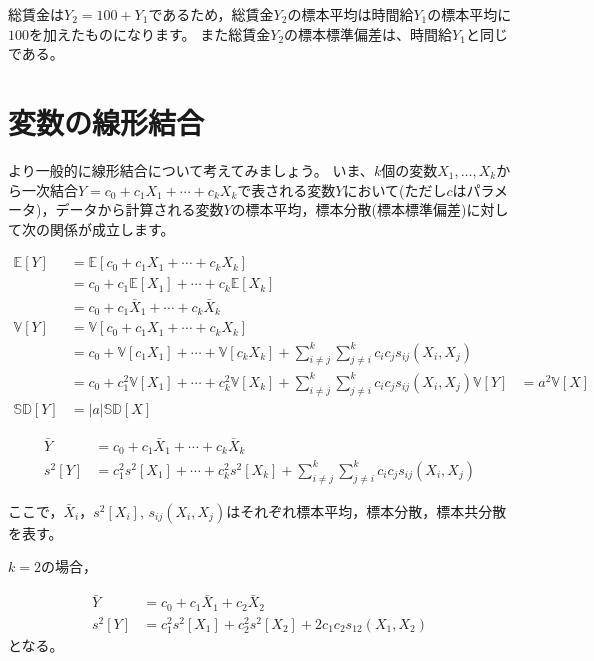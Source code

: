 \documentclass[
  letterpaper,
  pandoc,
  ja=standard,
  jafont = hiragino-pron]{ltjsbook}
\begin{document}
総賃金は\(Y_2 = 100 + Y_1\)であるため，総賃金\(Y_2\)の標本平均は時間給\(Y_1\)の標本平均に\(100\)を加えたものになります。
また総賃金\(Y_2\)の標本標準偏差は、時間給\(Y_1\)と同じである。

\section{変数の線形結合}\label{ux5909ux6570ux306eux7ddaux5f62ux7d50ux5408}

より一般的に線形結合について考えてみましょう。
いま、\(k\)個の変数\(X_1,\dots ,X_k\)から一次結合\(Y = c_0 + c_1 X_1 + \cdots + c_k X_k\)で表される変数\(Y\)において(ただし\(c\)はパラメータ)，データから計算される変数\(Y\)の標本平均，標本分散(標本標準偏差)に対して次の関係が成立します。

\[
\begin{aligned}
\mathbb{E}[Y] &= \mathbb{E}[c_0 + c_1 X_1 + \cdots + c_k X_k ]\\
            &= c_0 + c_1 \mathbb{E}[X_1] + \cdots + c_k\mathbb{E}[ X_k ] \\
            &= c_0 + c_1 \bar{X}_1 + \cdots + c_k\bar{X}_k \\
\mathbb{V}[Y] &= \mathbb{V}[c_0 + c_1 X_1 + \cdots + c_k X_k ]\\
&= c_0 + \mathbb{V}[c_1 X_1] + \cdots + \mathbb{V}[c_k X_k ] + \sum _{i \not = j}^k  \sum _{j \not = i}^k c_i c_j s_{ij}(X_i,X_j)\\
&= c_0 + c_1^2\mathbb{V}[X_1] + \cdots + c_k^2\mathbb{V}[X_k ] + \sum _{i \not = j}^k  \sum _{j \not = i}^k c_i c_j s_{ij}(X_i,X_j)
\mathbb{V}[Y] &= a^2 \mathbb{V}[X] \\
\mathbb{SD}[Y] &= |a| \mathbb{SD}[X]
\end{aligned}
\]

\[
\begin{aligned}
\bar Y &= c_0 + c_1 \bar X_1 + \cdots + c_k \bar X_k \\
s^2[Y] &= c_1^2 s^2[X_1] + \cdots + c_k^2 s^2[X_k] + \sum _{i \not = j}^k \sum _{j \not = i}^k c_i c_j s_{ij}(X_i,X_j)
\end{aligned}
\]

ここで，\(\bar X_i\)，\(s^2[X_i]\),
\(s_{ij}(X_i,X_j)\)はそれぞれ標本平均，標本分散，標本共分散を表す。

\(k=2\)の場合，

\[
\begin{aligned}
\bar Y &= c_0 + c_1 \bar X_1 + c_2 \bar X_2 \\
s^2[Y] &= c_1^2 s^2[X_1] + c_2^2 s^2[X_2] + 2 c_1 c_2 s_{12}(X_1,X_2)
\end{aligned}
\] となる。
\end{document}
